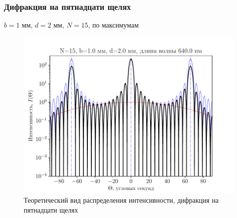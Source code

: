 \subsubsection{Дифракция на пятнадцати щелях}
\begin{table}[H]
	    \caption{$b=1$ мм, $d=2$ мм, $N=15$, по максимумам}
	    \label{tab:chem1}

	\mytable
	
\end{table}
\begin{figure}[H]
	\centering
	\includegraphics[]{plot/N15}
	\caption{Теоретический вид распределения интенсивности, дифракция на пятнадцати щелях}
	\label{fig:figure1}
\end{figure}




